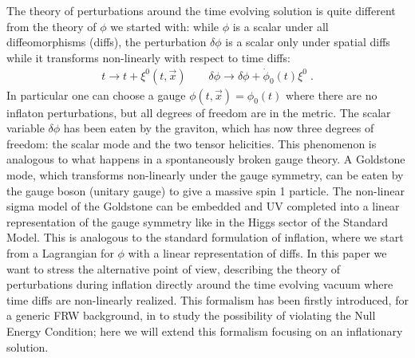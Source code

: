 \documentclass[12pt,letterpaper]{article}
\def\be{\begin{eqnarray}}
\def\ee{\end{eqnarray}}
\begin{document}
{The theory of perturbations around the time evolving solution is quite different from the theory of $\phi$ we started with: while $\phi$ is a scalar under all diffeomorphisms (diffs), the perturbation $\delta\phi$ is a scalar only under spatial diffs while it transforms non-linearly with respect to time diffs:
\be
t \to t + \xi^0(t, \vec x)   \qquad \delta\phi \to \delta\phi + \dot\phi_0(t) \xi^0 \;.
\ee
In particular one can choose a gauge $\phi(t,\vec x)=\phi_0(t)$ where there are no inflaton perturbations, but all degrees of freedom are in the metric. The scalar variable $\delta\phi$ has been eaten by the graviton, which has now three degrees of freedom: the scalar mode and the two tensor helicities. 
This phenomenon is analogous to what happens in a spontaneously broken
gauge theory. A Goldstone mode, which transforms non-linearly under
the gauge symmetry, can be eaten by the gauge boson (unitary gauge) to
give a massive spin 1 particle. The non-linear sigma model of the
Goldstone can be embedded and UV completed into a linear
representation of the gauge symmetry like in the Higgs sector of the
Standard Model. This is analogous to the standard formulation of
inflation, where we start from a Lagrangian for $\phi$ with a linear
representation of diffs. In this paper we want to stress the
alternative point of view, describing the theory of perturbations
during inflation directly around the time evolving vacuum where time
diffs are non-linearly realized. This formalism has been firstly
introduced, for a generic FRW background, in
\cite{Creminelli:2006xe} to study the possibility of violating the
Null Energy Condition; here we will extend this formalism focusing on
an inflationary solution.

}
\end{document}
